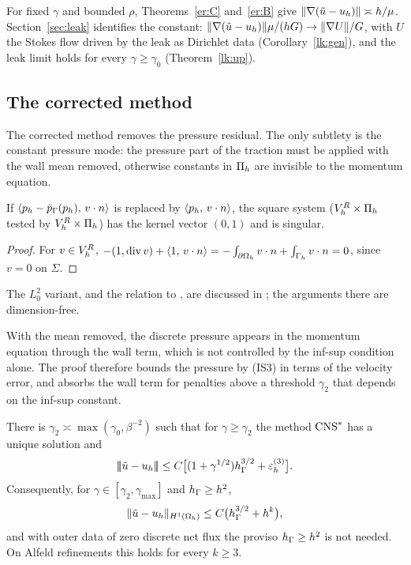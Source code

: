 For fixed $\gamma$ and bounded $\rho$, Theorems~\ref{er:C} and~\ref{er:B} give $\lVert \nabla(\tilde u-u_h)\rVert\asymp h/\mu$. Section~\ref{sec:leak} identifies the constant: $\lVert \nabla(\tilde u-u_h)\rVert\mu/(hG)\to\lVert \nabla U\rVert/G$, with $U$ the Stokes flow driven by the leak as Dirichlet data (Corollary~\ref{lk:gen}), and the leak limit holds for every $\gamma\ge\gamma_0$ (Theorem~\ref{lk:up}).

\subsection{The corrected method}
The corrected method removes the pressure residual. The only subtlety is the constant pressure mode: the pressure part of the traction must be applied with the wall mean removed, otherwise constants in $\Pi_h$ are invisible to the momentum equation.

\begin{proposition}\label{er:singular}
If $\langle p_h-\bar p_{\Gamma}(p_h),\, v\cdot n\rangle$ is replaced by $\langle p_h,\, v\cdot n\rangle$, the square system ($V_h^R\times\Pi_h$ tested by $V_h^R\times\Pi_h$) has the kernel vector $(0,1)$ and is singular.
\end{proposition}

\begin{proof}
For $v\in V_h^R$, $-(1,\operatorname{div} v)+\langle 1,\, v\cdot n\rangle=-\int_{\partial\Omega_h}v\cdot n+\int_{\Gamma_h}v\cdot n=0$, since $v=0$ on $\Sigma$.
\end{proof}
The $L^2_0$ variant, and the relation to \cite{FrachonNilssonZahedi2024}, are discussed in \cite{PadhiLong2D}; the arguments there are dimension-free.

With the mean removed, the discrete pressure appears in the momentum equation through the wall term, which is not controlled by the inf-sup condition alone. The proof therefore bounds the pressure by (IS3) in terms of the velocity error, and absorbs the wall term for penalties above a threshold $\gamma_2$ that depends on the inf-sup constant.

\begin{theorem}\label{er:D}
There is $\gamma_2\asymp\max(\gamma_0,\beta^{-2})$ such that for $\gamma\ge\gamma_2$ the method $\mathrm{CNS}^\ast$ has a unique solution and
\[
|\!|\!|\tilde u-u_h|\!|\!|\le C\bigl[(1+\gamma^{1/2})h_\Gamma^{3/2}+\varepsilon_h^{(3)}\bigr].
\]
Consequently, for $\gamma\in[\gamma_2,\gamma_{\max}]$ and $h_\Gamma\ge h^2$,
\[
\lVert \tilde u-u_h\rVert_{H^1(\Omega_h)}\le C\bigl(h_\Gamma^{3/2}+h^k\bigr),
\]
and with outer data of zero discrete net flux the proviso $h_\Gamma\ge h^2$ is not needed. On Alfeld refinements this holds for every $k\ge3$.
\end{theorem}

